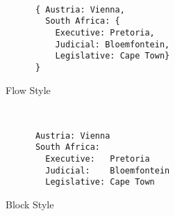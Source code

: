 \documentclass[a4paper, svgnames, 12pt]{article}
\begin{document}
\begin{figure}[H]
  \begin{minipage}[t]{0.48\textwidth}
    \vspace{0pt}
    \begin{bchart}[max=9, width=0.85\textwidth]
    \end{bchart}
  \end{minipage}
  \begin{minipage}[t]{0pt}~\end{minipage}
  \begin{minipage}[t]{0.48\textwidth}
    \vspace{0pt}
    \begin{verbatim}
      { Austria: Vienna,
        South Africa: {
          Executive: Pretoria,
          Judicial: Bloemfontein,
          Legislative: Cape Town}
      }
    \end{verbatim}
  \end{minipage}
  \caption{Flow Style}
\end{figure}

\begin{figure}[H]
  \begin{minipage}[t]{0.48\textwidth}
    \vspace{0pt}
    \begin{bchart}[max=9, width=0.85\textwidth]
    \end{bchart}
  \end{minipage}
  \begin{minipage}[t]{0pt}~\end{minipage}
  \begin{minipage}[t]{0.48\textwidth}
    \vspace{0pt}
    \begin{verbatim}
      Austria: Vienna
      South Africa:
        Executive:   Pretoria
        Judicial:    Bloemfontein
        Legislative: Cape Town
    \end{verbatim}
  \end{minipage}
  \caption{Block Style}
\end{figure}
\end{document}
